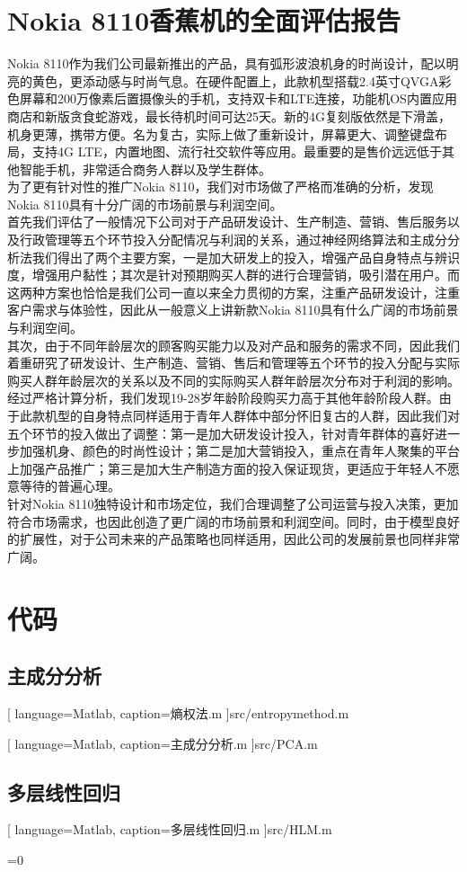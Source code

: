 \documentclass{article}
\begin{document}
\fi
\clearpage
{}
\begin{appendix}
	\section{Nokia 8110香蕉机的全面评估报告}
	Nokia 8110作为我们公司最新推出的产品，具有弧形波浪机身的时尚设计，配以明亮的黄色，更添动感与时尚气息。在硬件配置上，此款机型搭载2.4英寸QVGA彩色屏幕和200万像素后置摄像头的手机，支持双卡和LTE连接，功能机OS内置应用商店和新版贪食蛇游戏，最长待机时间可达25天。新的4G复刻版依然是下滑盖，机身更薄，携带方便。名为复古，实际上做了重新设计，屏幕更大、调整键盘布局，支持4G LTE，内置地图、流行社交软件等应用。最重要的是售价远远低于其他智能手机，非常适合商务人群以及学生群体。
	\\\indent 为了更有针对性的推广Nokia 8110，我们对市场做了严格而准确的分析，发现Nokia 8110具有十分广阔的市场前景与利润空间。
	\\\indent 首先我们评估了一般情况下公司对于产品研发设计、生产制造、营销、售后服务以及行政管理等五个环节投入分配情况与利润的关系，通过神经网络算法和主成分分析法我们得出了两个主要方案，一是加大研发上的投入，增强产品自身特点与辨识度，增强用户黏性；其次是针对预期购买人群的进行合理营销，吸引潜在用户。而这两种方案也恰恰是我们公司一直以来全力贯彻的方案，注重产品研发设计，注重客户需求与体验性，因此从一般意义上讲新款Nokia 8110具有什么广阔的市场前景与利润空间。
	\\\indent 其次，由于不同年龄层次的顾客购买能力以及对产品和服务的需求不同，因此我们着重研究了研发设计、生产制造、营销、售后和管理等五个环节的投入分配与实际购买人群年龄层次的关系以及不同的实际购买人群年龄层次分布对于利润的影响。经过严格计算分析，我们发现19-28岁年龄阶段购买力高于其他年龄阶段人群。由于此款机型的自身特点同样适用于青年人群体中部分怀旧复古的人群，因此我们对五个环节的投入做出了调整：第一是加大研发设计投入，针对青年群体的喜好进一步加强机身、颜色的时尚性设计；第二是加大营销投入，重点在青年人聚集的平台上加强产品推广；第三是加大生产制造方面的投入保证现货，更适应于年轻人不愿意等待的普遍心理。
	\\\indent 针对Nokia 8110独特设计和市场定位，我们合理调整了公司运营与投入决策，更加符合市场需求，也因此创造了更广阔的市场前景和利润空间。同时，由于模型良好的扩展性，对于公司未来的产品策略也同样适用，因此公司的发展前景也同样非常广阔。
	\clearpage
	\section{代码}
	\subsection{主成分分析}
	
	[	language=Matlab,
		caption=熵权法.m
	]{src/entropymethod.m}
	
	[	language=Matlab,
		caption=主成分分析.m
	]{src/PCA.m}
	\subsection{多层线性回归}
	
	[	language=Matlab,
		caption=多层线性回归.m
	]{src/HLM.m}
\end{appendix}
\ifnum{}=0
	
\end{document}
